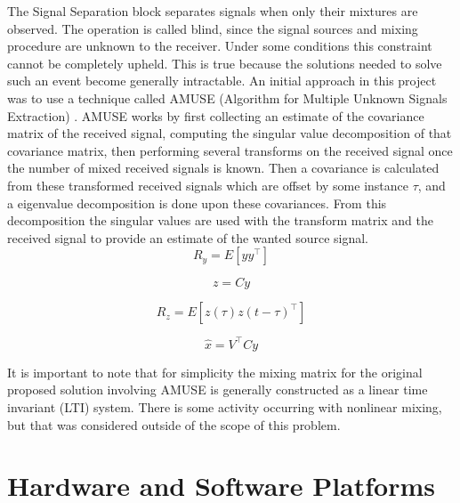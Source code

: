 The Signal Separation block separates signals when only their mixtures are observed.  The operation is called blind, since the signal sources and mixing procedure are unknown to the receiver.  Under some conditions this constraint cannot be completely upheld.  This is true because the solutions needed to solve such an event become generally intractable.  An initial approach in this project was to use a technique called AMUSE (Algorithm for Multiple Unknown Signals Extraction) \cite{AMUSE}.  AMUSE works by first collecting an estimate of the covariance matrix of the received signal, computing the singular value decomposition of that covariance matrix, then performing several transforms on the received signal once the number of mixed received signals is known.  Then a covariance is calculated from these transformed received signals which are offset by some instance \(\tau\), and a eigenvalue decomposition is done upon these covariances.  From this decomposition the singular values are used with the transform matrix and the received signal to provide an estimate of the wanted source signal.\\

\begin{equation}\label{}
R_{y}=E[yy^\top]
\end{equation}

\begin{equation}\label{}
z=Cy
\end{equation}

\begin{equation}\label{}
R_{z}=E[z(\tau)z(t-\tau)^\top]
\end{equation}

\begin{equation}\label{}
\hat{x}=V^\top Cy
\end{equation}

It is important to note that for simplicity the mixing matrix for the original proposed solution involving AMUSE is generally constructed as a linear time invariant (LTI) system.  There is some activity occurring with nonlinear mixing, but that was considered outside of the scope of this problem.\\

\section{Hardware and Software Platforms}


